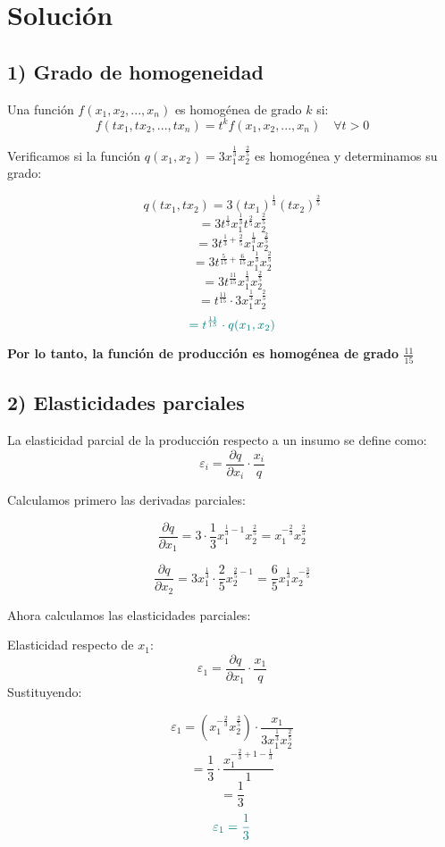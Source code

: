 \documentclass{article}
\begin{document}
\newpage
\section*{Solución}

\subsection*{1) Grado de homogeneidad}

Una función \(f(x_1,x_2,...,x_n)\) es homogénea de grado \(k\) si:
\[
f(tx_1,tx_2,...,tx_n) = t^k f(x_1,x_2,...,x_n) \quad \forall t > 0
\]

Verificamos si la función \(q(x_1,x_2) = 3x_1^{\frac{1}{3}}x_2^{\frac{2}{5}}\) es homogénea y determinamos su grado:

\[
q(tx_1,tx_2) = 3(tx_1)^{\frac{1}{3}}(tx_2)^{\frac{2}{5}}
\]
\[
= 3t^{\frac{1}{3}}x_1^{\frac{1}{3}}t^{\frac{2}{5}}x_2^{\frac{2}{5}}
\]
\[
= 3t^{\frac{1}{3}+\frac{2}{5}}x_1^{\frac{1}{3}}x_2^{\frac{2}{5}}
\]
\[
= 3t^{\frac{5}{15}+\frac{6}{15}}x_1^{\frac{1}{3}}x_2^{\frac{2}{5}}
\]
\[
= 3t^{\frac{11}{15}}x_1^{\frac{1}{3}}x_2^{\frac{2}{5}}
\]
\[
= t^{\frac{11}{15}} \cdot 3x_1^{\frac{1}{3}}x_2^{\frac{2}{5}}
\]
\[
\color{teal}
= t^{\frac{11}{15}} \cdot q(x_1,x_2)
\]

\textbf{\color{teal}Por lo tanto, la función de producción es homogénea de grado \(\frac{11}{15}\)}

\subsection*{2) Elasticidades parciales}

La elasticidad parcial de la producción respecto a un insumo se define como:
\[
\varepsilon_i = \frac{\partial q}{\partial x_i} \cdot \frac{x_i}{q}
\]

Calculamos primero las derivadas parciales:

\[
\frac{\partial q}{\partial x_1} = 3 \cdot \frac{1}{3} x_1^{\frac{1}{3}-1} x_2^{\frac{2}{5}}
= x_1^{-\frac{2}{3}} x_2^{\frac{2}{5}}
\]

\[
\frac{\partial q}{\partial x_2} = 3x_1^{\frac{1}{3}} \cdot \frac{2}{5} x_2^{\frac{2}{5}-1}
= \frac{6}{5}x_1^{\frac{1}{3}}x_2^{-\frac{3}{5}}
\]

Ahora calculamos las elasticidades parciales:

Elasticidad respecto de \(x_1\):
\[
\varepsilon_1 = \frac{\partial q}{\partial x_1} \cdot \frac{x_1}{q}
\]
Sustituyendo:

\[
\varepsilon_1 = \left(x_1^{-\frac{2}{3}}x_2^{\frac{2}{5}}\right) \cdot \frac{x_1}{3x_1^{\frac{1}{3}}x_2^{\frac{2}{5}}}
\]
\[
= \frac{1}{3} \cdot \frac{x_1^{-\frac{2}{3}+1-\frac{1}{3}}}{1}
\]
\[
= \frac{1}{3}
\]
\[
\color{teal}
\varepsilon_1 = \frac{1}{3}
\]
\end{document}
